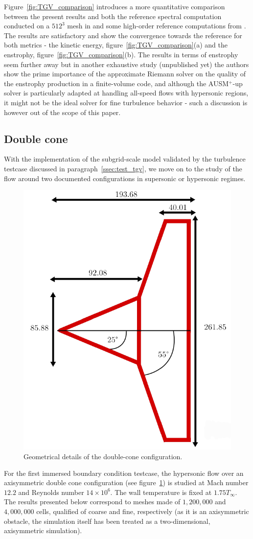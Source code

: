 Figure~\ref{fig:TGV_comparison} introduces a more quantitative comparison between the present results and both the reference spectral computation conducted on a $512^3$ mesh in \cite{diosady2015case} and some high-order reference computations from \cite{giangaspero2015case}.
The results are satisfactory and show the convergence towards the reference for both metrics - the kinetic energy, figure~\ref{fig:TGV_comparison}(a) and the enstrophy, figure~\ref{fig:TGV_comparison}(b).
The results in terms of enstrophy seem further away but in another exhaustive study (unpublished yet) the authors show the prime importance of the approximate Riemann solver on the quality of the enstrophy production in a finite-volume code, and although the AUSM$^+$-up solver is particularly adapted at handling all-speed flows with hypersonic regions, it might not be the ideal solver for fine turbulence behavior - such a discussion is however out of the scope of this paper.

\subsection{Double cone}\label{ssec:test_double_cone}

With the implementation of the subgrid-scale model validated by the turbulence testcase discussed in paragraph~\ref{ssec:test_tgv}, we move on to the study of the flow around two documented configurations in supersonic or hypersonic regimes.

\begin{figure}[ht!]
    \centering
    \includegraphics[width=0.40\linewidth]{chapter3_numerical_methods/pictures/double_cone.pdf}
    \caption{Geometrical details of the double-cone configuration.}
    \label{fig:double_cone_geom}
\end{figure}

For the first immersed boundary condition testcase, the hypersonic flow over an axisymmetric double cone configuration (see figure~\ref{fig:double_cone_geom}) is studied at Mach number $12.2$ and Reynolds number $14 \times 10^6$.
The wall temperature is fixed at $1.75T_{\infty}$.
The results presented below correspond to meshes made of $1,200,000$ and $4,000,000$ cells, qualified of coarse and fine, respectively (as it is an axisymmetric obstacle, the simulation itself has been treated as a two-dimensional, axisymmetric simulation).

